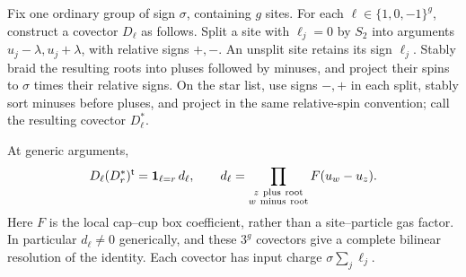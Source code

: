 \begin{lemma}
\label{lem:06-dual-covectors}
Fix one ordinary group of sign \(\sigma\), containing \(g\) sites.
For each \(\ell\in\{1,0,-1\}^g\), construct a covector \(D_\ell\) as
follows.  Split a site with \(\ell_j=0\) by \(S_2\) into arguments
\(u_j-\lambda,u_j+\lambda\), with relative signs \(+,-\).
An unsplit site retains its sign \(\ell_j\).
Stably braid the resulting roots into pluses followed by minuses,
and project their spins to \(\sigma\) times their relative signs.
On the star list, use signs \(-,+\) in each split, stably sort minuses
before pluses, and project in the same relative-spin convention;
call the resulting covector \(D_\ell^*\).

At generic arguments,
\begin{equation}
 D_\ell(D_r^*)^{\mathsf t}
 =\mathbf 1_{\ell=r}\,d_\ell,\qquad
 d_\ell=\prod_{\substack{z\ {\rm plus\ root}\\w\ {\rm minus\ root}}}
 F(u_w-u_z).
 \label{eq:06-biorthogonality}
\end{equation}
Here \(F\) is the local cap--cup box coefficient, rather than a
site--particle gas factor.  In particular \(d_\ell\ne0\) generically,
and these \(3^g\) covectors give a complete bilinear resolution of the
identity.  Each covector has input charge
\(\sigma\sum_j\ell_j\).
\end{lemma}

